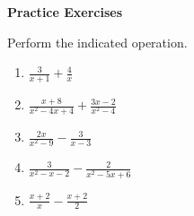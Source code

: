 \textbf{Practice Exercises}

\vspce

Perform the indicated  operation. 
\vspce

\begin{enumerate}[label = \arabic*. ]

\item \hspce $\displaystyle \frac{3}{x+1} + \frac{4}{x}$ 
\vspce
\item \hspce $\displaystyle \frac{x+8}{x^{2}-4x+4}+\frac{3x-2}{x^{2}-4}$ 
\vspce
\item \hspce $\displaystyle \frac{2x}{x^{2}-9}-\frac{3}{x-3}$
\vspce
\item \hspce $\displaystyle \frac{3}{x^{2}-x-2} - \frac{2}{x^{2}-5x+6}$
\vspce
\item \hspce $\displaystyle \frac{x+2}{x} - \frac{x+2}{2}$

\end{enumerate}